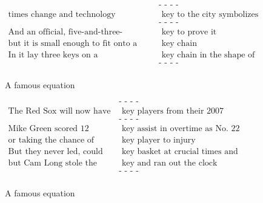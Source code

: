 \documentclass[a4paper,12pt,twoside,openright]{report}
\begin{document}
\begin{figure}[H]
\begin{align}
 \text{                                                 } & \text{- - - -} \nonumber \\
\text{times change and technology advances, the} & \text{ key to the city symbolizes } \nonumber \\
\text{                                                 } & \text{- - - -} \nonumber \\
\text{And an official, five-and-three-quarters-inch-long gold-plated pewter} & \text{ key to prove it} \nonumber \\
\text{but it is small enough to fit onto a} & \text{ key chain} \nonumber \\
\text{In it lay three keys on a} & \text{ key chain in the shape of a red speedboat} \nonumber \\
\text{                                                 } & \text{- - - -} \nonumber \\
\end{align}
\caption{A famous equation}
\end{figure}


\begin{figure}[H]
\begin{align}
\text{                                                 } & \text{- - - -} \nonumber \\
\text{The Red Sox will now have all their} & \text{ key players from their 2007 championship team} \nonumber \\
\text{                                                 } & \text{- - - -} \nonumber \\
\text{Mike Green scored 12 points and had a} & \text{ key assist in overtime as No. 22 Butler beat Virginia Tech} \nonumber \\
\text{or taking the chance of losing a} & \text{ key player to injury} \nonumber \\
\text{But they never led, could not get a} & \text{ key basket at crucial times and played like a team } \nonumber \\
  \text{but Cam Long stole the ball near the top of the} & \text{ key and ran out the clock} \nonumber \\
\text{                                                 } & \text{- - - -} \nonumber \\
\end{align}
\caption{A famous equation}
\end{figure}
\end{document}
